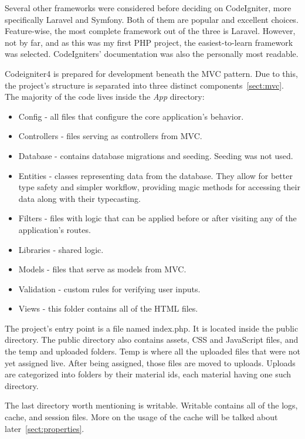 \documentclass[
  digital,     %
  oneside,     %
  nosansbold,  %
  colorbold, %
  lof,         %
  lot,         %
]{fithesis4}
\begin{document}
Several other frameworks were considered before deciding on CodeIgniter, more specifically Laravel and Symfony. Both of them are popular and excellent choices. Feature-wise, the most complete framework out of the three is Laravel. However, not by far, and as this was my first PHP project, the easiest-to-learn framework was selected. CodeIgniters' documentation was also the personally most readable.

Codeigniter4 is prepared for development beneath the MVC pattern. Due to this, the project's structure is separated into three distinct components~\ref{sect:mvc}. The majority of the code lives inside the \textit{App} directory:

\begin{itemize}
	\item Config - all files that configure the core application's behavior.
	\item Controllers - files serving as controllers from MVC.
	\item Database - contains database migrations and seeding. Seeding was not used.
	\item Entities - classes representing data from the database. They allow for better type safety and simpler workflow, providing magic methods for accessing their data along with their typecasting.
	\item Filters - files with logic that can be applied before or after visiting any of the application's routes.
	\item Libraries - shared logic.
	\item Models - files that serve as models from MVC.
	\item Validation - custom rules for verifying user inputs.
	\item Views - this folder contains all of the HTML files.
\end{itemize}

The project's entry point is a file named index.php. It is located inside the public directory. The public directory also contains assets, CSS and JavaScript files, and the temp and uploaded folders. Temp is where all the uploaded files that were not yet assigned live. After being assigned, those files are moved to uploads. Uploads are categorized into folders by their material ids, each material having one such directory.

The last directory worth mentioning is writable. Writable contains all of the logs, cache, and session files. More on the usage of the cache will be talked about later~\ref{sect:properties}.
 
\end{document}
